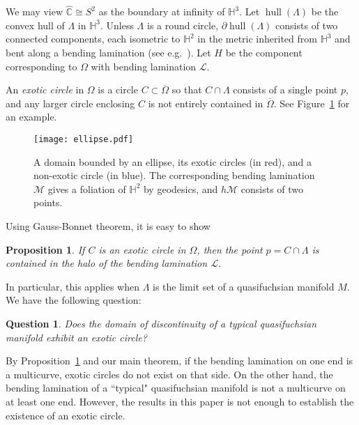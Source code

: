 \documentclass[11pt]{article} %
\theoremstyle{plain}
\newtheorem{prop}[thm]{Proposition}
\newtheorem{ques}[thm]{Question}
\theoremstyle{definition}
\DeclareMathOperator{\hull}{hull}
\numberwithin{equation}{section}
\begin{document}
We may view $\hat{\mathbb{C}}\cong S^2$ as the boundary at infinity of $\mathbb{H}^3$. Let $\hull(\Lambda)$ be the convex hull of $\Lambda$ in $\mathbb{H}^3$. Unless $\Lambda$ is a round circle, $\partial\hull(\Lambda)$ consists of two connected components, each isometric to $\mathbb{H}^2$ in the metric inherited from $\mathbb{H}^3$ and bent along a bending lamination (see e.g.\ \cite{bending}). Let $H$ be the component corresponding to $\Omega$ with bending lamination $\mathcal{L}$.

An \emph{exotic circle} in $\Omega$ is a circle $C\subset\overline{\Omega}$ so that $C\cap\Lambda$ consists of a single point $p$, and any larger circle enclosing $C$ is not entirely contained in $\overline{\Omega}$. See Figure~\ref{fig:ellipse} for an example.
\begin{figure}[ht!]
    \centering
    \captionsetup{width=.8\linewidth}
    \texttt{[image: ellipse.pdf]}
    \iffalse
    \begin{tikzpicture}
    \draw[thick] (0,0) ellipse (3 and 1.5);
    \draw[red] (2.25,0) circle (0.75);
    \draw[red] (-2.25,0) circle (0.75);
    \draw[blue] (0,1) circle (0.5);
    \draw[blue, dashed] (0,0) circle (1.5);
    \end{tikzpicture}
    \fi
    \caption{A domain bounded by an ellipse, its exotic circles (in red), and a non-exotic circle (in blue). The corresponding bending lamination $\mathcal{M}$ gives a foliation of $\mathbb{H}^2$ by geodesics, and $h\mathcal{M}$ consists of two points.}
    \label{fig:ellipse}
\end{figure}

Using Gauss-Bonnet theorem, it is easy to show
\begin{prop}\label{prop:exotic_circle_necessary}
If $C$ is an exotic circle in $\Omega$, then the point $p=C\cap\Lambda$ is contained in the halo of the bending lamination $\mathcal{L}$.
\end{prop}
In particular, this applies when $\Lambda$ is the limit set of a quasifuchsian manifold $M$. We have the following question:
\begin{ques}
Does the domain of discontinuity of a typical quasifuchsian manifold exhibit an exotic circle?
\end{ques}

By Proposition~\ref{prop:exotic_circle_necessary} and our main theorem, if the bending lamination on one end is a multicurve, exotic circles do not exist on that side. On the other hand, the bending lamination of a ``typical" quasifuchsian manifold is not a multicurve on at least one end. However, the results in this paper is not enough to establish the existence of an exotic circle.
\end{document}

